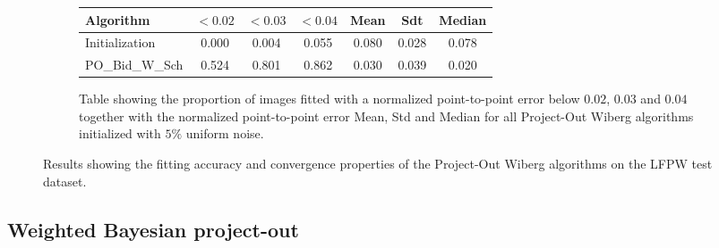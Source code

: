 \begin{figure}[p]
\begin{subfigure}{0.48\textwidth}
	    \label{fig:mean_cost_vs_iters2_po_w_5}
	\end{subfigure}
	\par\bigskip\bigskip
	\begin{subfigure}{\textwidth}
		\center
		\begin{tabular}{lcccccc}
		    \toprule
		    Algorithm & $<0.02$ & $<0.03$ & $<0.04$ & Mean & Sdt & Median 
		    \\
		    \midrule
		    Initialization & 0.000 & 0.004 & 0.055 & 0.080 & 0.028 & 0.078
		    \\ 
		    PO\_Bid\_W\_Sch & 0.524 & 0.801 & 0.862 & 0.030 & 0.039 & 0.020
		    \\
		    \bottomrule
	  	\end{tabular}
	  	\caption{Table showing the proportion of images fitted with a normalized point-to-point error below $0.02$, $0.03$ and $0.04$ together with the normalized point-to-point error Mean, Std and Median for all Project-Out Wiberg algorithms initialized with $5\%$ uniform noise.}
	    \label{tab:stats_po_w_5}
	\end{subfigure}
	\caption{Results showing the fitting accuracy and convergence properties of the Project-Out Wiberg algorithms on the LFPW test dataset.}
	\label{fig:po_w_5}
\end{figure}








\subsection{Weighted Bayesian project-out}

